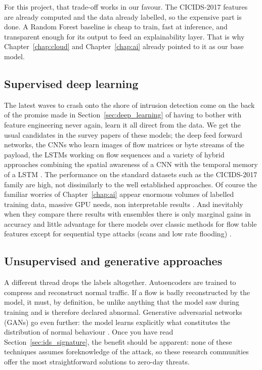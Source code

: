 For this project, that trade-off works in our favour. The CICIDS-2017 features are already computed and the data already labelled, so the expensive part is done. A Random Forest baseline is cheap to train, fast at inference, and transparent enough for its output to feed an explainability layer. That is why Chapter~\ref{chap:cloud} and Chapter~\ref{chap:ai} already pointed to it as our base model.

\subsection{Supervised deep learning}
\label{sec:ids_deep}

The latest waves to crash onto the shore of intrusion detection come on the back of the promise made in Section~\ref{sec:deep_learning} of having to bother with feature engineering never again, learn it all direct from the data. We get the usual candidates in the survey papers of these models; the deep feed forward networks, the CNNs who learn images of flow matrices or byte streams of the payload, the LSTMs working on flow sequences and a variety of hybrid approaches combining the spatial awareness of a CNN with the temporal memory of a LSTM \cite{kimanzi2024deep, ahmad2021network}. The performance on the standard datasets such as the CICIDS-2017 family are high, not dissimilarly to the well established approaches. Of course the familiar worries of Chapter~\ref{chap:ai} appear enormous volumes of labelled training data, massive GPU needs, non interpretable results \cite{ahmad2021network}. And inevitably when they compare there results with ensembles there is only marginal gains in accuracy \cite{ali2025dlvsml} and little advantage for there models over classic methods for flow table features except for sequential type attacks (scans and low rate flooding) .

\subsection{Unsupervised and generative approaches}
\label{sec:ids_unsupervised}

A different thread drops the labels altogether. Autoencoders are trained to compress and reconstruct normal traffic. If a flow is badly reconstructed by the model, it must, by definition, be unlike anything that the model saw during training and is therefore declared abnormal. 
Generative adversarial networks (GANs) go even further: the model learns explicitly what constitutes the distribution of normal behaviour \cite{kimanzi2024deep}. 
Once you have read Section~\ref{sec:ids_signature}, the benefit should be apparent: none of these techniques assumes foreknowledge of the attack, so these research communities offer the most straightforward solutions to zero-day threats.


